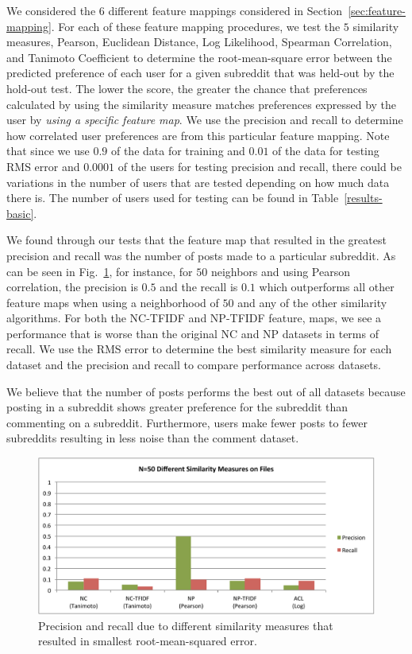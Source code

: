\documentclass{article}
\begin{document}
We considered the $6$ different feature mappings considered in Section~\ref{sec:feature-mapping}. For each of these
feature mapping procedures, we test the $5$ similarity measures, Pearson, Euclidean Distance, Log Likelihood, 
Spearman Correlation, and Tanimoto Coefficient to determine the root-mean-square error between the predicted 
preference of each user for a given subreddit that was held-out by the hold-out test. The lower the score, the 
greater the chance that preferences calculated by using the similarity measure matches preferences expressed 
by the user by \emph{using a specific feature map}. We use the precision and recall to determine how correlated 
user preferences are from this particular feature mapping. Note that since we use $0.9$ of the data for training
and $0.01$ of the data for testing RMS error and $0.0001$ of the users for testing precision and recall, there
could be variations in the number of users that are tested depending on how much data there is. The number of users used for testing can be found in
Table~\ref{results-basic}.

We found through our tests that the feature map that resulted in the greatest precision and recall was the 
number of posts made to a particular subreddit. As can be seen in Fig.~\ref{fig:feature-map}, for instance,
for $50$ neighbors and using Pearson correlation, the precision is $0.5$ and the recall is $0.1$ which 
outperforms all other feature maps when using a neighborhood of $50$ and any of the other
similarity algorithms. For both the NC-TFIDF and NP-TFIDF feature, maps, we see  a performance
that is worse than the original NC and NP datasets in terms of recall. We use the RMS error to 
determine the best similarity measure for each dataset and the precision and recall to compare 
performance across datasets.

We believe that the number of posts performs the best out of all datasets because posting in a subreddit
shows greater preference for the subreddit than commenting on a subreddit. Furthermore, users
make fewer posts to fewer subreddits resulting in less noise than the comment dataset. 

\begin{figure}[h]
\includegraphics[width=\textwidth]{img/sim-on-files.pdf}
\caption{Precision and recall due to different similarity measures that resulted in smallest
root-mean-squared error.}\label{fig:feature-map}
\end{figure} 
\end{document}
